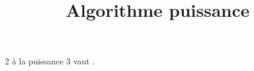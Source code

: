 \documentclass{article}
\title{Algorithme puissance}
\author{}
\date{}
\begin{document}
  \maketitle

  2 \`a la puissance 3 vaut .
\end{document}

